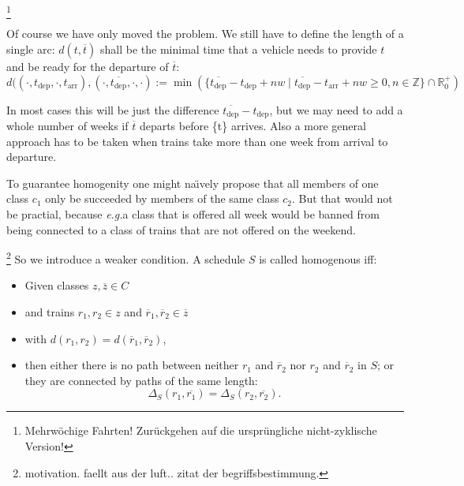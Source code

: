 \documentclass[a4paper]{amsart} %
\def\eg{\emph{e.g.}}
\def\naively{na\"{\i}vely}	%
\newcommand{\ol}[1]{\overline{#1}}
\newcommand{\todo}[1]{\footnote{#1}}
\begin{document}
\todo{Mehrwöchige Fahrten!  Zurückgehen auf die ursprüngliche nicht-zyklische Version!}

Of course we have only moved the problem.  We still have to define the length of a single arc:  \(d(t, \ol{t})\) shall be the minimal time that a vehicle needs to provide \(t\) and be ready for the departure of \(\ol{t}\):
\[
d ((\cdot, t_{\textrm{dep}}, \cdot, t_{\textrm{arr}}), (\cdot, \ol{t_{\textrm{dep}}},\cdot, \cdot)  :=
\min (\{\ol{t_{\textrm{dep}}} - t_{\textrm{dep}} + n w \mid \ol{t_{\textrm{dep}}} - t_{\textrm{arr}} + nw \geq 0, n \in \mathbb{Z}\} \cap \mathbb{R}^+_0)
\]

In most cases this will be just the difference \(\ol{t_{\textrm{dep}}}
- t_{\textrm{dep}}\), but we may need to add a whole number of weeks
if \(\ol{t}\) departs before \{t\} arrives.  Also a more general approach
has to be taken when trains take more than one week from arrival to
departure.

To guarantee homogenity one might \naively{} propose that all members
of one class \(c_1\) only be succeeded by members of the same class
\(c_2\).  But that would not be practial, because \eg a class that is
offered all week would be banned from being connected to a class of trains that
are not offered on the weekend.

\todo{motivation.  faellt aus der luft.. zitat der begriffsbestimmung.}
So we introduce a weaker condition.  A schedule \(S\) is called
homogenous iff:
\begin{itemize}
\item Given classes \(z, \ol{z} \in C\)
\item and trains \(r_1, r_2 \in z\) and \(\ol{r}_1,\ol{r}_2 \in \ol{z}\)
\item with \( d (r_1, r_2) = d(\ol{r}_1, \ol{r}_2) \),
\item then either there is no path between neither \(r_1\) and
  \(\ol{r}_2\) nor \(r_2\) and \(\ol{r}_2\) in \(S\); or they are connected by paths of the same length:
\begin{equation}
\label{homoEq}
  \Delta_S (r_1, \ol{r_1}) = \Delta_S (r_2, \ol{r_2})\textrm{.}
\end{equation}
\end{itemize}
\end{document}
